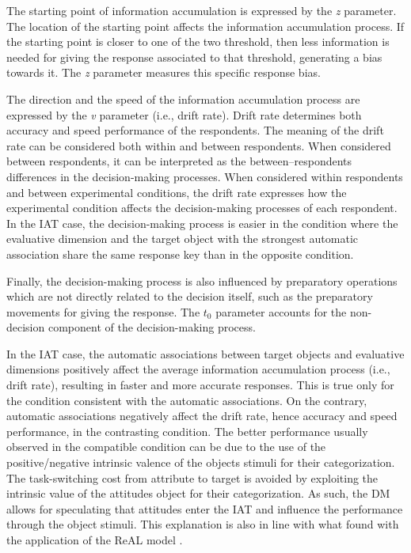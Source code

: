\documentclass[12pt]{book}
\begin{document}
The starting point of information accumulation is expressed by the \emph{z} parameter. The location of the starting point affects the information accumulation process. If the starting point is closer to one of the two threshold, then less information is needed for giving the response associated to that threshold, generating a bias towards it. The \emph{z} parameter measures this specific response bias.

The direction and the speed of the information accumulation process are expressed by the \emph{v} parameter (i.e., drift rate). 
Drift rate determines both accuracy and speed performance of the respondents. 
The meaning of the drift rate can be considered both within and between respondents. When considered between respondents, it can be interpreted as the between--respondents differences in the decision-making processes. 
When considered within respondents and between experimental conditions, the drift rate expresses how the experimental condition  affects the decision-making processes of each respondent. In the IAT case, the decision-making process is easier in the condition where the evaluative dimension and the target object with the strongest automatic association share the same response key than in the opposite condition. 

Finally, the decision-making process is also influenced by preparatory operations which are not directly related to the decision itself, such as the preparatory movements for giving the response. 
The $t_0$ parameter accounts for the non-decision component of the decision-making process.  

In the IAT case, the automatic associations between target objects and evaluative dimensions positively affect the average information accumulation process (i.e., drift rate), resulting in faster and more accurate responses. This is true only for the condition consistent with the automatic associations. On the contrary, automatic associations negatively affect the drift rate, hence accuracy and speed performance, in the contrasting condition.
The better performance usually observed in the compatible condition can be due to the use of the positive/negative intrinsic valence of the objects stimuli for their categorization. The task-switching cost from attribute to target is avoided by exploiting the intrinsic value of the attitudes object for their categorization. 
As such, the DM allows for speculating that attitudes enter the IAT and influence the performance through the object stimuli. This explanation is also in line with what found with the application of the ReAL model \cite{Meissner2013}.
\end{document}
